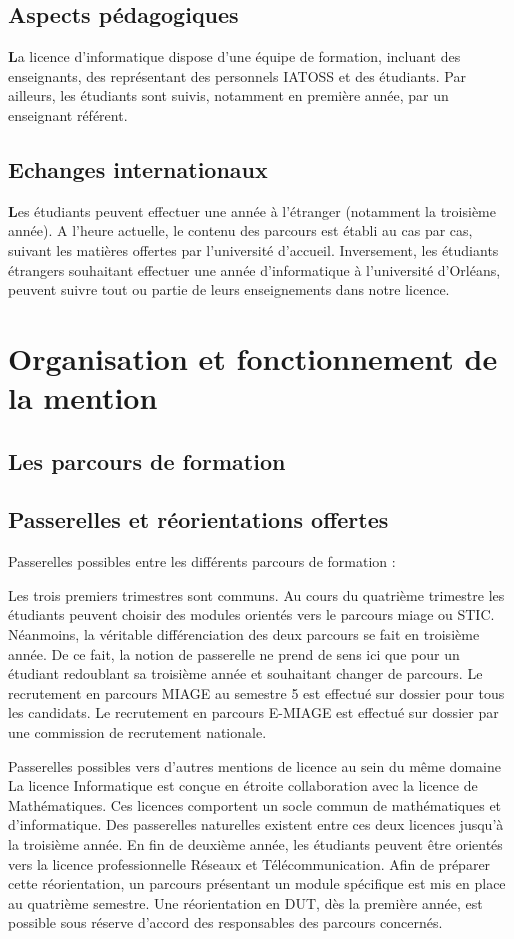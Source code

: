 \begin{spacing}{1.5}
{\section*{Aspects pédagogiques}
\textcolor{couleurFonce}{\textbf{\Large{L}}}a licence d’informatique dispose d’une équipe de formation, incluant des enseignants, des représentant des personnels IATOSS et des étudiants. Par ailleurs, les étudiants sont suivis, notamment en première année, par un enseignant référent.

\section*{Echanges internationaux}
\textcolor{couleurFonce}{\textbf{\Large{L}}}es étudiants peuvent effectuer une année à l’étranger (notamment la troisième année). A l’heure actuelle, le contenu des parcours est établi au cas par cas, suivant les matières offertes par l’université d’accueil. Inversement, les étudiants étrangers souhaitant effectuer une année d’informatique à l’université d’Orléans, peuvent suivre tout ou partie de leurs enseignements dans notre licence. 
}

\chapter*{Organisation et fonctionnement de la mention}
\section*{Les parcours de formation}
\section*{Passerelles et réorientations offertes}
Passerelles possibles entre les différents parcours de formation :

Les trois premiers trimestres sont communs. Au cours du quatrième trimestre les étudiants peuvent choisir des modules orientés vers le parcours miage ou STIC. Néanmoins, la véritable différenciation des deux parcours se fait en troisième année. De ce fait, la notion de passerelle ne prend de sens ici que pour un étudiant redoublant sa troisième année et souhaitant changer de parcours.
Le recrutement en parcours MIAGE au semestre 5 est effectué sur dossier pour tous les candidats. 
Le recrutement en parcours E-MIAGE est effectué sur dossier par une commission de recrutement nationale. 

Passerelles possibles vers d’autres mentions de licence au sein du même domaine
La licence Informatique est  conçue en étroite collaboration avec la licence de Mathématiques. Ces licences comportent un socle commun de mathématiques et d’informatique. Des passerelles naturelles existent entre ces deux licences jusqu'à la troisième année.
En fin de deuxième année, les étudiants peuvent être orientés vers la licence professionnelle Réseaux et Télécommunication. Afin de préparer cette réorientation, un parcours présentant un module spécifique est mis en place au quatrième semestre.
Une réorientation en DUT, dès la première année, est possible sous réserve d'accord des responsables des parcours concernés.


\end{spacing}
